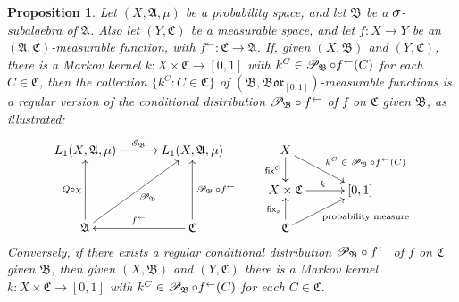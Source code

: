 \documentclass[
twoside=true,
paper=letter,
fontsize=9pt,
pagesize=auto,
leqno,
openany,
headsepline,
overfullrule,
]{scrbook}
\theoremstyle{plain}
\theoremstyle{plain}
\newtheorem{prop}[thm]{Proposition}
\theoremstyle{definition}
\theoremstyle{bfnoteitalic}
\theoremstyle{bfnoteroman}
\newcommand{\sigalg}[1]{\mathfrak{#1}}
\newcommand{\cali}[1]{\mathscr{#1}}
\newcommand{\sfop}[1]{\mathsf{#1}}
\newcommand{\condexpop}[1]{\mathop{\cali{E}\hspace{-1pt}}\nolimits_{#1}}
\newcommand{\condprobop}[1]{\mathop{\cali{P}\hspace{-1pt}}\nolimits_{#1}}
\newcommand{\borel}{\mathfrak{Bor}}
\newcommand{\textsigma}{\hbox{\large{$\sigma$}}\kern-1pt}
\newcommand{\preimage}[1]{#1^{\leftarrow}}
\newcommand{\sigmaalgebra}{\sigalg{A}}
\newcommand{\sigmaalgebraii}{\sigalg{B}}
\newcommand{\sigmaalgebraiii}{\sigalg{C}}
\newcommand{\Lone}{L_1(\measurespace, \sigmaalgebra, \measure)}
\newcommand{\function}{f}
\newcommand{\measurespace}{X}
\newcommand{\measurespaceii}{Y}
\newcommand{\mspaceelt}{x}
\newcommand{\measure}{\mu}
\newcommand{\setiii}{C}
\newcommand{\markovkernel}{k}
\newcommand{\fixinthefirst}[1]{\sfop{fix}_{#1}}
\newcommand{\fixinthesecond}[1]{\sfop{fix}^{#1}}
\begin{document}
\begin{prop}\label{equivalent_definition_regular_distribution}
Let $(\measurespace, \sigmaalgebra, \measure)$ be a probability space, and let $\sigmaalgebraii$ be a $\textsigma$-subalgebra of $\sigmaalgebra$. Also let $(\measurespaceii, \sigmaalgebraiii)$ be a measurable space, and let 
$\function:\measurespace\to\measurespaceii$ be an
$(\sigmaalgebra, \sigmaalgebraiii)$\hyp{}measurable function, with
$\preimage{\function} : \sigmaalgebraiii \to \sigmaalgebra$.
If, given $(\measurespace, \sigmaalgebraii)$ and $(\measurespaceii, \sigmaalgebraiii)$, 
there is a Markov kernel $\markovkernel:\measurespace\times\sigmaalgebraiii\to [0,1]$ with 
$\markovkernel^{\setiii} \in \condprobop{\sigmaalgebraii}\circ \preimage{\function}(\setiii)$ for each
$\setiii\in\sigmaalgebraiii$, then the collection 
$\{ 
\markovkernel^{\setiii}
: 
\setiii\in\sigmaalgebraiii
\}$
of $(\sigmaalgebraii,\borel_{[0,1]})$\hyp{}measurable functions
is a regular version of the conditional distribution ${\condprobop{\sigmaalgebraii}}\circ \preimage{\function}$ of 
$\function$ on $\sigmaalgebraiii$ given $\sigmaalgebraii$, as illustrated:
\[
\xymatrix@R=16pt@C=30pt{ 
\Lone \ar[r]^{\condexpop{\sigmaalgebraii}}
& \Lone 
& \measurespace 
\ar[d]_-{\fixinthesecond{\setiii}} 
\ar[dr]^{\qquad\text{$\markovkernel^{\setiii} \in \condprobop{\sigmaalgebraii}\circ \preimage{\function}(\setiii)$}}
\\
& 
& \measurespace\times\sigmaalgebraiii \ar[r]^{\markovkernel} 
& [0,1] 
\\
\sigmaalgebra \ar[uu]^{Q\circ\chi} \ar[uur]_{\condprobop{\sigmaalgebraii}} 
& \sigmaalgebraiii 
\ar[uu]_{\condprobop{\sigmaalgebraii}\circ \preimage{\function}} 
\ar[l]_{\preimage{\function}}
& \sigmaalgebraiii \ar[ur]_{\qquad\text{probability measure}} \ar[u]^{\fixinthefirst{\mspaceelt}} 
& 
\\
}
\]
Conversely, if there exists a regular conditional distribution  
${\condprobop{\sigmaalgebraii}}\circ \preimage{\function}$ 
of 
$\function$ on $\sigmaalgebraiii$ given $\sigmaalgebraii$, then
given $(\measurespace, \sigmaalgebraii)$ and $(\measurespaceii, \sigmaalgebraiii)$ 
there is a Markov kernel $k:\measurespace\times\sigmaalgebraiii\to [0,1]$ with 
$k^{\setiii} \in
\condprobop{\sigmaalgebraii}\circ \preimage{\function}(\setiii)$ for each 
$\setiii\in\sigmaalgebraiii$.
\end{prop}
\end{document}
